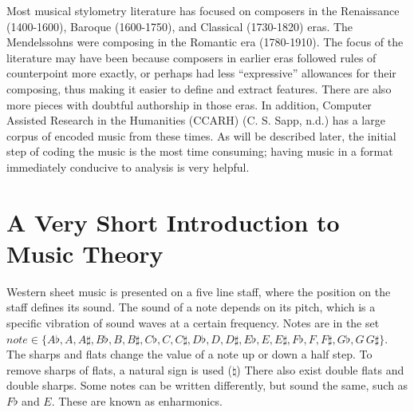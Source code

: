\documentclass[12pt,twoside]{reedthesis}
\theoremstyle{definition}
\theoremstyle{definition}
\theoremstyle{definition}
\theoremstyle{remark}
\begin{document}
Most musical stylometry literature has focused on composers in the
Renaissance (1400-1600), Baroque (1600-1750), and Classical (1730-1820)
eras. The Mendelssohns were composing in the Romantic era (1780-1910).
The focus of the literature may have been because composers in earlier
eras followed rules of counterpoint more exactly, or perhaps had less
``expressive'' allowances for their composing, thus making it easier to
define and extract features. There are also more pieces with doubtful
authorship in those eras. In addition, Computer Assisted Research in the
Humanities (CCARH) (C. S. Sapp, n.d.) has a large corpus of encoded
music from these times. As will be described later, the initial step of
coding the music is the most time consuming; having music in a format
immediately conducive to analysis is very helpful.

\section{A Very Short Introduction to Music
Theory}\label{a-very-short-introduction-to-music-theory}

Western sheet music is presented on a five line staff, where the
position on the staff defines its sound. The sound of a note depends on
its pitch, which is a specific vibration of sound waves at a certain
frequency. Notes are in the set
\(note \in \{A\flat,A,A\sharp,B\flat,B,B\sharp,C\flat,C,C\sharp,D\flat,D,D\sharp,E\flat,E,E\sharp,F\flat,F,F\sharp,G\flat,G\,G\sharp\}\).
The sharps and flats change the value of a note up or down a half step.
To remove sharps of flats, a natural sign is used (\(\natural\)) There
also exist double flats and double sharps. Some notes can be written
differently, but sound the same, such as \(F\flat\) and \(E\). These are
known as enharmonics.
\end{document}
